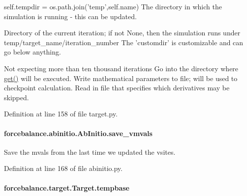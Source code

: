 self.\-tempdir = os.\-path.\-join('temp',self.\-name) The directory in which the simulation is running -\/ this can be updated. 

Directory of the current iteration; if not None, then the simulation runs under temp/target\-\_\-name/iteration\-\_\-number The 'customdir' is customizable and can go below anything.

Not expecting more than ten thousand iterations Go into the directory where \hyperlink{classforcebalance_1_1target_1_1Target_a1389888302c49d529716cb45b13a6f5a}{get()} will be executed. Write mathematical parameters to file; will be used to checkpoint calculation. Read in file that specifies which derivatives may be skipped. 

Definition at line 158 of file target.\-py.

\hypertarget{classforcebalance_1_1abinitio_1_1AbInitio_a22037bf43728fa45f387390005e0b131}{
\paragraph[{save\-\_\-vmvals}]{\setlength{\rightskip}{0pt plus 5cm}forcebalance.\-abinitio.\-Ab\-Initio.\-save\-\_\-vmvals\hspace{0.3cm}{\ttfamily [inherited]}}}\label{classforcebalance_1_1abinitio_1_1AbInitio_a22037bf43728fa45f387390005e0b131}


Save the mvals from the last time we updated the vsites. 



Definition at line 168 of file abinitio.\-py.

\hypertarget{classforcebalance_1_1target_1_1Target_ae5b544d3e11365865813ef3d626ef81d}{
\paragraph[{tempbase}]{\setlength{\rightskip}{0pt plus 5cm}forcebalance.\-target.\-Target.\-tempbase\hspace{0.3cm}{\ttfamily [inherited]}}}\label{classforcebalance_1_1target_1_1Target_ae5b544d3e11365865813ef3d626ef81d}


